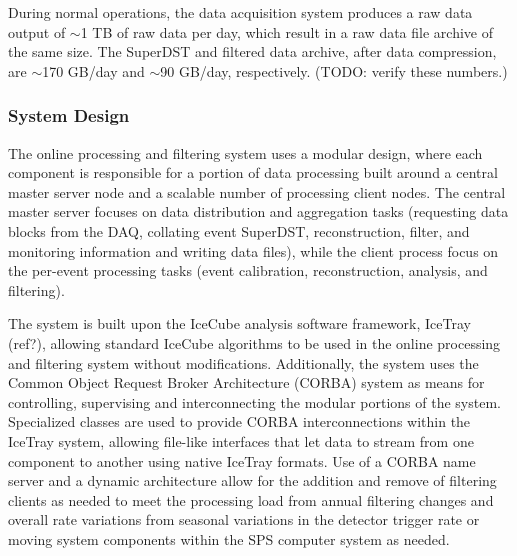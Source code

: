 During normal operations, the data acquisition system produces a raw data output of $\sim$1 TB of raw data per day, which result in
a raw data file archive of the same size.  The SuperDST  and filtered data archive, after data compression, are $\sim$170 GB/day and $\sim$90 GB/day,
respectively.  (TODO: verify these numbers.)
\subsubsection{System Design}

The online processing and filtering system uses a modular design, where each component
is responsible for a portion of data processing built around a central master server node and a
scalable number of processing client nodes.  The central master server focuses on
data distribution and aggregation tasks (requesting data blocks from the DAQ, collating event SuperDST, reconstruction, filter,
and monitoring information and writing data files), while the client process focus on the per-event
processing tasks (event calibration, reconstruction, analysis, and filtering).  

The system is built upon the IceCube analysis software framework, IceTray (ref?), allowing standard IceCube algorithms to
be used in the online processing and filtering system without modifications.  Additionally, the system uses the 
Common Object Request Broker Architecture (CORBA) system as means for controlling, supervising and interconnecting
the modular portions of the system.  Specialized classes are used to provide CORBA interconnections
within the IceTray system, allowing file-like interfaces that let data to stream from one component to another
using native IceTray formats.  Use of a CORBA name server and a dynamic architecture allow for the
addition and remove of filtering clients as needed to meet the processing load from annual filtering
changes and overall rate variations from seasonal variations in the detector trigger rate or moving system components within the SPS
computer system as needed.

